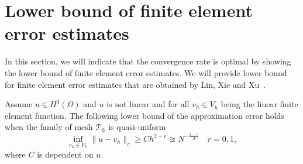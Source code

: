 
\section{Lower bound  of finite element error estimates}
In this section, we will indicate that the convergence rate is optimal by showing the lower bound of finite element error estimates. 
We will provide lower bound for finite element error estimates that are obtained by Lin, Xie and Xu~\cite{lin2014lower}.
\begin{theorem}\label{Lower_Bound_linear}
Assume $u\in H^{3}(\Omega)$ and $u$ is not linear %
and for all $v_h\in V_h$ being the linear finite element function.
The following lower bound of the approximation error holds when the family of mesh $\mathcal{T}_h$
is quasi-uniform %
\begin{equation}\label{lower_convergence_0_1}
\inf_{v_h\in V_h}\|u-v_h\|_{r}\geq Ch^{2-r}\approxeq N^{-\frac{2-r}{d}}\quad r=0, 1,
\end{equation}
where $C$ is dependent on $u$.
\end{theorem}
